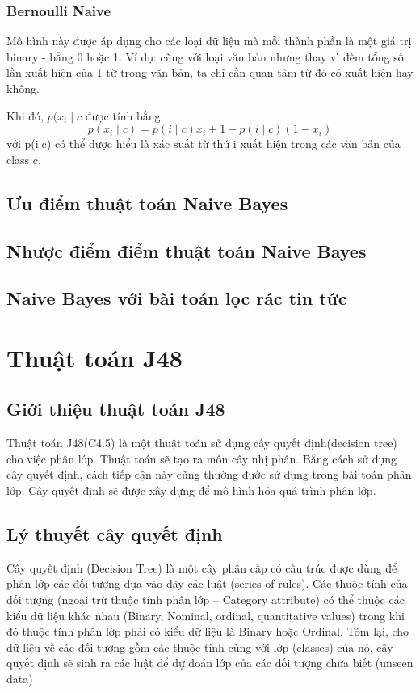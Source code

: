 	\subsubsection{Bernoulli Naive}
	Mô hình này được áp dụng cho các loại dữ liệu mà mỗi thành phần là một giá trị binary - bẳng 0 hoặc 1. Ví dụ: cũng với loại văn bản nhưng thay vì đếm tổng số lần xuất hiện của 1 từ trong văn bản, ta chỉ cần quan tâm từ đó có xuất hiện hay không.
	
	Khi đó, $p(x_i \mid c $ được tính bằng:
	\begin{equation}
		p(x_i \mid c) = p(i \mid c)x_i + 1-p(i\mid c)(1- x_i)
	\end{equation}
	với p(i|c) có thể được hiểu là xác suất từ thứ i xuất hiện trong các văn bản của class c.
	 
	\subsection{Ưu điểm thuật toán Naive Bayes}
	\subsection{Nhược điểm điểm thuật toán Naive Bayes}
	\subsection{Naive Bayes với bài toán lọc rác tin tức}
\section{Thuật toán J48}
	\subsection{Giới thiệu thuật toán J48}
		Thuật toán J48(C4.5) là một thuật toán sử dụng cây quyết định(decision tree) cho việc phân lớp. Thuật toán sẽ tạo ra môn cây nhị phân. Bằng cách sử dụng cây quyết định, cách tiếp cận này cũng thường đước sử dụng trong bài toán phân lớp. Cây quyết định sẽ được xây dựng để mô hình hóa quá trình phân lớp.
	\subsection{Lý thuyết cây quyết định}
		Cây quyết định (Decision Tree) là một cây phân cấp có cấu trúc được dùng để phân lớp các đối tượng dựa vào dãy các luật (series of rules). Các thuộc tính của đối tượng (ngoại trừ thuộc tính phân lớp – Category attribute) có thể thuộc các kiểu dữ liệu khác nhau (Binary, Nominal, ordinal, quantitative values) trong khi đó thuộc tính phân lớp phải có kiểu dữ liệu là Binary hoặc Ordinal.
		Tóm lại, cho dữ liệu về các đối tượng gồm các thuộc tính cùng với lớp (classes) của nó, cây quyết định sẽ sinh ra các luật để dự đoán lớp của các đối tượng chưa biết (unseen data)

